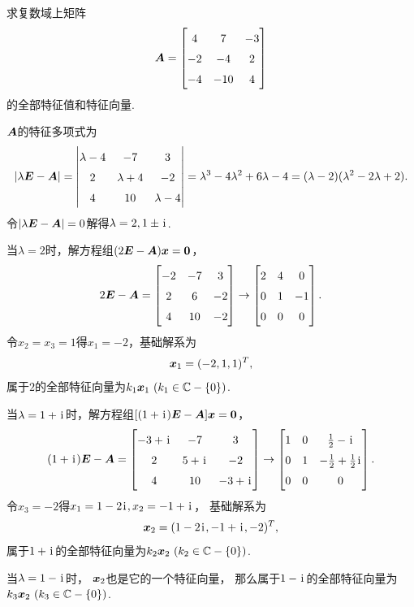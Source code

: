 \begin{example}
求复数域上矩阵\begin{equation*}
	\vb{A} = \begin{bmatrix}
		4 & 7 & -3 \\
		-2 & -4 & 2 \\
		-4 & -10 & 4
	\end{bmatrix}
\end{equation*}的全部特征值和特征向量.
\begin{solution}
\(\boldsymbol{A}\)的特征多项式为\begin{equation*}
	\DeterminantA{\lambda\vb{E}-\vb{A}}
	= \begin{vmatrix}
		\lambda-4 & -7 & 3 \\
		2 & \lambda+4 & -2 \\
		4 & 10 & \lambda-4
	\end{vmatrix}
	= \lambda^3 - 4\lambda^2 + 6\lambda - 4
	= (\lambda-2)(\lambda^2-2\lambda+2).
\end{equation*}
令\(\abs{\lambda\boldsymbol{E}-\boldsymbol{A}}=0\)解得\(\lambda=2,1\pm\kern1pt\mathrm{i}\kern1pt\).

当\(\lambda=2\)时，解方程组\((2\boldsymbol{E}-\boldsymbol{A})\boldsymbol{x}=\boldsymbol0\)，\begin{equation*}
	2\vb{E}-\vb{A} = \begin{bmatrix}
		-2 & -7 & 3 \\
		2 & 6 & -2 \\
		4 & 10 & -2
	\end{bmatrix} \to \begin{bmatrix}
		2 & 4 & 0 \\
		0 & 1 & -1 \\
		0 & 0 & 0
	\end{bmatrix}.
\end{equation*}
令\(x_2=x_3=1\)得\(x_1=-2\)，基础解系为\begin{equation*}
	\boldsymbol{x}_1 = (-2,1,1)^T,
\end{equation*}
属于\(2\)的全部特征向量为\(k_1\boldsymbol{x}_1\ (k_1\in\mathbb{C}-\{0\})\).

当\(\lambda=1+\kern1pt\mathrm{i}\kern1pt\)时，解方程组\([(1+\kern1pt\mathrm{i}\kern1pt)\boldsymbol{E}-\boldsymbol{A}]\boldsymbol{x}=\boldsymbol0\)，\begin{equation*}
	(1+\iu)\vb{E}-\vb{A} = \begin{bmatrix}
		-3+\iu & -7 & 3 \\
		2 & 5+\iu & -2 \\
		4 & 10 & -3+\iu
	\end{bmatrix}
	\to \def\arraystretch{1.5}\begin{bmatrix}
		1 & 0 & \frac{1}{2}-\iu \\
		0 & 1 & -\frac{1}{2}+\frac{1}{2}\iu \\
		0 & 0 & 0
	\end{bmatrix}.
\end{equation*}
令\(x_3=-2\)得\(x_1=1-2\kern1pt\mathrm{i}\kern1pt,x_2=-1+\kern1pt\mathrm{i}\kern1pt\)，
基础解系为\begin{equation*}
	\boldsymbol{x}_2 = (1-2\kern1pt\mathrm{i}\kern1pt,-1+\kern1pt\mathrm{i}\kern1pt,-2)^T,
\end{equation*}
属于\(1+\kern1pt\mathrm{i}\kern1pt\)的全部特征向量为\(k_2\boldsymbol{x}_2\ (k_2\in\mathbb{C}-\{0\})\).

当\(\lambda=1-\kern1pt\mathrm{i}\kern1pt\)时，
\(\boldsymbol{x}_2\)也是它的一个特征向量，
那么属于\(1-\kern1pt\mathrm{i}\kern1pt\)的全部特征向量为\(k_3\boldsymbol{x}_2\ (k_3\in\mathbb{C}-\{0\})\).
\end{solution}
\end{example}
